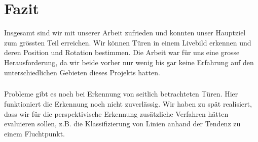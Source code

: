 \chapter{Fazit}

Insgesamt sind wir mit unserer Arbeit zufrieden und konnten unser Hauptziel zum grössten Teil erreichen. Wir können Türen in einem Livebild erkennen und deren Position und Rotation bestimmen. Die Arbeit war für uns eine grosse Herausforderung, da wir beide vorher nur wenig bis gar keine Erfahrung auf den unterschiedlichen Gebieten dieses Projekts hatten.
\noindent\paragraph{}
Probleme gibt es noch bei Erkennung von seitlich betrachteten Türen. Hier funktioniert die Erkennung noch nicht zuverlässig. Wir haben zu spät realisiert, dass wir für die perspektivische Erkennung zusätzliche Verfahren hätten evaluieren sollen, z.B. die Klassifizierung von Linien anhand der Tendenz zu einem Fluchtpunkt.


